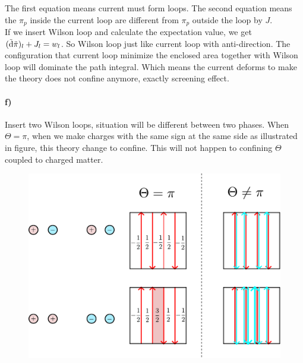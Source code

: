 \documentclass[a4paper,11pt]{article}
\begin{document}
The first equation means current must form loops. The second equation means the $\pi_p$ inside the current loop are different from $\pi_p$ outside the loop by $J$.\\
If we insert Wilson loop and calculate the expectation value, we get $(\tilde{\rm d} \tilde{\pi})_l + J_l = w_l$. So Wilson loop just like current loop with anti-direction. The configuration that current loop minimize the enclosed area together with Wilson loop will dominate the path integral. Which means the current deforms to make the theory does not confine anymore, exactly screening effect.

\paragraph{f)}
Insert two Wilson loops, situation will be different between two phases. When $\Theta = \pi$, when we make charges with the same sign at the same side as illustrated in figure, this theory change to confine. This will not happen to confining $\Theta$ coupled to charged matter.
\begin{figure}
    \centering
    \includegraphics[width = 0.6\linewidth]{two_loop.pdf}
\end{figure}
\end{document}
